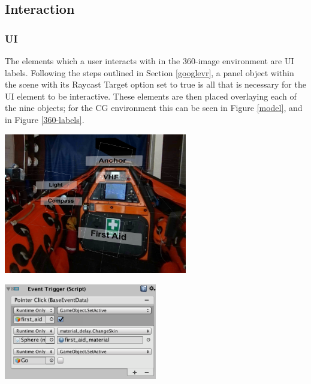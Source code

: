 \documentclass[ %
                    author={Elis Jones},
                supervisor={Dr. Kirsten Cater},
                    degree={BSc},
                     title={The Effect of Presentation Medium on Spatial Cognition},
                  subtitle={in the Virtual Environment},
                      year={2018} ]{dissertation}
\begin{document}
\subsection{Interaction}\label{interaction}

\subsubsection{UI}
The elements which a user interacts with in the 360-image environment are UI labels. Following the steps outlined in Section \ref{googlevr}, a panel object within the scene with its Raycast Target option set to true is all that is necessary for the UI element to be interactive. These elements are then placed overlaying each of the nine objects; for the CG environment this can be seen in Figure \ref{model}, and in Figure \ref{360-labels}. 

\begin{minipage}{\textwidth}
    \centering
    \includegraphics[width=0.6\textwidth]{images/360-labels.png}
    \label{360-labels}
\end{minipage}
    

\begin{minipage}{\textwidth}
    \centering
    \includegraphics[width=0.5\textwidth]{images/360-event-component.png}
    \label{360-event}
\end{minipage}
\end{document}
